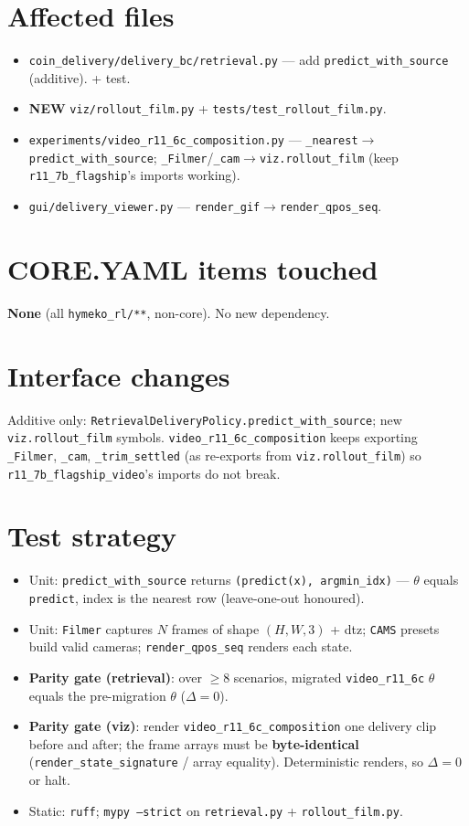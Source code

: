 \documentclass[11pt]{article}
\begin{document}
\section{Affected files}
\begin{itemize}[nosep]
  \item \texttt{coin\_delivery/delivery\_bc/retrieval.py} --- add \texttt{predict\_with\_source} (additive). + test.
  \item \textbf{NEW} \texttt{viz/rollout\_film.py} + \texttt{tests/test\_rollout\_film.py}.
  \item \texttt{experiments/video\_r11\_6c\_composition.py} --- \texttt{\_nearest}$\to$\texttt{predict\_with\_source};
    \texttt{\_Filmer}/\texttt{\_cam}$\to$\texttt{viz.rollout\_film} (keep \texttt{r11\_7b\_flagship}'s imports working).
  \item \texttt{gui/delivery\_viewer.py} --- \texttt{render\_gif}$\to$\texttt{render\_qpos\_seq}.
\end{itemize}

\section{CORE.YAML items touched}
\textbf{None} (all \texttt{hymeko\_rl/**}, non-core). No new dependency.

\section{Interface changes}
Additive only: \texttt{RetrievalDeliveryPolicy.predict\_with\_source}; new \texttt{viz.rollout\_film} symbols.
\texttt{video\_r11\_6c\_composition} keeps exporting \texttt{\_Filmer}, \texttt{\_cam}, \texttt{\_trim\_settled} (as
re-exports from \texttt{viz.rollout\_film}) so \texttt{r11\_7b\_flagship\_video}'s imports do not break.

\section{Test strategy}
\begin{itemize}[nosep]
  \item Unit: \texttt{predict\_with\_source} returns \texttt{(predict(x), argmin\_idx)} --- $\theta$ equals
    \texttt{predict}, index is the nearest row (leave-one-out honoured).
  \item Unit: \texttt{Filmer} captures $N$ frames of shape $(H,W,3)$ + dtz; \texttt{CAMS} presets build valid cameras;
    \texttt{render\_qpos\_seq} renders each state.
  \item \textbf{Parity gate (retrieval)}: over $\ge 8$ scenarios, migrated \texttt{video\_r11\_6c} $\theta$ equals the
    pre-migration $\theta$ ($\Delta = 0$).
  \item \textbf{Parity gate (viz)}: render \texttt{video\_r11\_6c\_composition} one delivery clip before and after; the
    frame arrays must be \textbf{byte-identical} (\texttt{render\_state\_signature} / array equality). Deterministic
    renders, so $\Delta = 0$ or halt.
  \item Static: \texttt{ruff}; \texttt{mypy --strict} on \texttt{retrieval.py} + \texttt{rollout\_film.py}.
\end{itemize}
\end{document}
